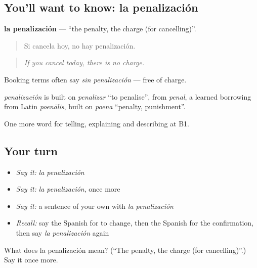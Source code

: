 \subsection*{You'll want to know: la penalización}
\textbf{la penalización} — \textquotedblleft{}the penalty, the charge (for cancelling)\textquotedblright{}.

\begin{quote}
Si cancela hoy, no hay penalización.
\end{quote}

\begin{quote}
\emph{If you cancel today, there is no charge.}
\end{quote}

Booking terms often say \emph{sin penalización} — free of charge.

\begin{cousinweb}
\emph{penalización} is built on \emph{penalizar} \textquotedblleft{}to penalise\textquotedblright{}, from \emph{penal}, a learned borrowing from Latin \emph{poenālis}, built on \emph{poena} \textquotedblleft{}penalty, punishment\textquotedblright{}.
\end{cousinweb}

\begin{grammarlens}[title={What you've built}]
One more word for telling, explaining and describing at B1.
\end{grammarlens}

\subsection*{Your turn}
\begin{itemize}
\raggedright
  \item \emph{Say it:} \emph{la penalización}
  \item \emph{Say it:} \emph{la penalización}, once more
  \item \emph{Say it:} a sentence of your own with \emph{la penalización}
  \item \emph{Recall:} say the Spanish for to change, then the Spanish for the confirmation, then say \emph{la penalización} again
\end{itemize}

\begin{tcolorbox}[breakable,colback=teal!4,colframe=teal!35!black,title={Before you move on}]
What does la penalización mean? (\textquotedblleft{}The penalty, the charge (for cancelling)\textquotedblright{}.) Say it once more.
\end{tcolorbox}
